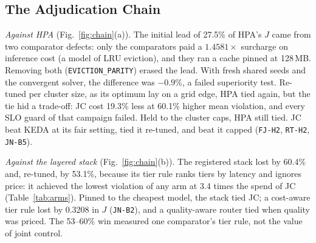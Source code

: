 \documentclass[conference,a4paper]{IEEEtran}
\newcommand{\jcac}{JC}
\newcommand{\jcac}{JCAC}
\newcommand{\rec}[1]{\texttt{\small #1}}
\begin{document}
\subsection{The Adjudication Chain}
\label{sec:chain}

\textit{Against HPA} (Fig.~\ref{fig:chain}(a)). The initial lead of 27.5\%
of HPA's $J$ came from two comparator defects: only the comparators paid a
$1.4581\times$ surcharge on inference cost (a model of LRU eviction), and
they ran a cache pinned at 128\,MB. Removing both (\rec{EVICTION\_PARITY})
erased the lead. With fresh shared seeds and the convergent solver, the
difference was $-0.9\%$, a failed superiority test. Re-tuned per cluster
size, as its optimum lay on a grid edge, HPA
tied again, but the tie hid a trade-off: \jcac{} cost 19.3\% less at 60.1\%
higher mean violation, and every SLO guard of that campaign failed. Held to
the cluster caps, HPA still tied. \jcac{} beat KEDA at its fair setting,
tied it re-tuned, and beat it capped (\rec{FJ-H2}, \rec{RT-H2},
\rec{JN-B5}).

\textit{Against the layered stack} (Fig.~\ref{fig:chain}(b)). The
registered stack lost by 60.4\% and, re-tuned, by 53.1\%, because its tier
rule ranks tiers by latency and ignores price: it achieved the lowest
violation of any arm at 3.4 times the spend of \jcac{}
(Table~\ref{tab:arms}). Pinned to the cheapest model, the stack tied
\jcac{}; a cost-aware tier rule lost by 0.3208 in $J$ (\rec{JN-B2}), and a
quality-aware router tied when quality was priced. The 53--60\% win
measured one comparator's tier rule, not the value of joint control.

\begin{table}[!t]
\caption{Mean Outcome per Arm in \rec{JOINTNESS} (60 Design Points
$\times$ 5 Reps). Cost: Simulated Dollars per Run; Viol.: Mean SLO
Violation; Excess: Uncapped Overshoot; Shed, Over.: Tenant-Steps With AI on
Tier ``None'' and Over Budget (\jcac{} Filters on Projected Cost).}
\label{tab:arms}
\centering
\scriptsize
\setlength{\tabcolsep}{2.6pt}

\end{table}

\begin{table}[!t]
\caption{What Survives the Adjudications: \jcac{} Minus Comparator on $J$
(Mean Paired Difference, 95\% Bootstrap CI; Negative: \jcac{} Better).
B: Better; T: Tie; W: Worse; EQ: Inside the $\pm0.025$ Margin.}
\label{tab:post}
\centering
\scriptsize
\setlength{\tabcolsep}{3.4pt}

\end{table}
\end{document}
